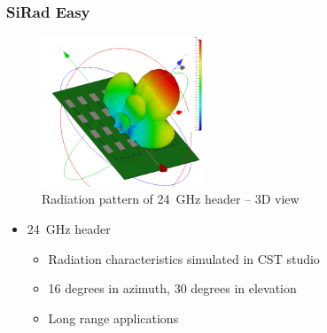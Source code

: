 \documentclass[aspectratio=43]{beamer}
\begin{document}
\begin{frame}[fragile]
  \frametitle{SiRad Easy}

  \begin{figure}[h!]
    \centering
    \includegraphics[width=0.43\textwidth]{../img/farfield3d.png}
    \caption{Radiation pattern of 24~GHz header -- 3D view}
    \label{fig:farfield3d}
  \end{figure}

  \begin{itemize}
    \item 24~GHz header
      \begin{itemize}
        \item Radiation characteristics simulated in CST studio
        \item 16 degrees in azimuth, 30 degrees in elevation
        \item Long range applications
      \end{itemize}
  \end{itemize}
\end{frame}
\end{document}
